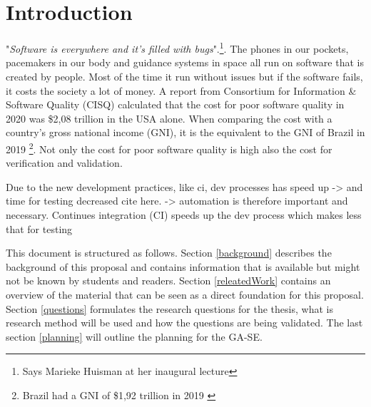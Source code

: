 \section{Introduction}
"\textit{Software is everywhere and it’s filled with bugs}".\cite{filledWithBugs}\footnote{Says Marieke Huisman at her inaugural lecture\cite{filledWithBugs}}. The phones in our pockets, pacemakers in our body and guidance systems in space all run on software that is created by people. Most of the time it run without issues but if the software fails, it costs the society a lot of money. A report from Consortium for Information \& Software Quality (CISQ) \cite{herb2020cost} calculated that the cost for poor software quality in 2020 was \$2,08 trillion in the USA alone. When comparing the cost with a country's gross national income (GNI), it is the equivalent to the GNI of Brazil in 2019 \cite{worldbank}\footnote{Brazil had a GNI of \$1,92 trillion in 2019 \cite{worldbank}}. Not only the cost for poor software quality is high also the cost for verification and validation. 


Due to the new development practices, like \acrfull{ci}, dev processes has speed up -> and time for testing decreased cite here. -> automation is therefore important and necessary.
Continues integration (CI) speeds up the dev process which makes less that for testing

This document is structured as follows. Section \ref{background} describes the background of this proposal and contains information that is available but might not be known by students and readers. Section \ref{releatedWork} contains an overview of the material that can be seen as a direct foundation for this proposal. Section \ref{questions} formulates the research questions for the thesis, what is research method will be used and how the questions are being validated. The last section \ref{planning} will outline the planning for the GA-SE.